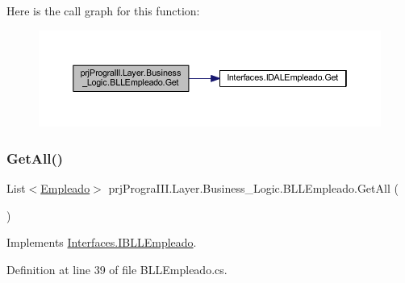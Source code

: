 Here is the call graph for this function\+:
\nopagebreak
\begin{figure}[H]
\begin{center}
\leavevmode
\includegraphics[width=350pt]{classprj_progra_i_i_i_1_1_layer_1_1_business___logic_1_1_b_l_l_empleado_abf66d9719a5e3c0f1914f0ae0d4ef671_cgraph}
\end{center}
\end{figure}
\hypertarget{classprj_progra_i_i_i_1_1_layer_1_1_business___logic_1_1_b_l_l_empleado_a78943295f86576befb00a28f59f64b07}{}\label{classprj_progra_i_i_i_1_1_layer_1_1_business___logic_1_1_b_l_l_empleado_a78943295f86576befb00a28f59f64b07} 
\subsubsection{\texorpdfstring{Get\+All()}{GetAll()}}
{\footnotesize\ttfamily List$<$\hyperlink{classprj_progra_i_i_i_1_1_layer_1_1_entities_1_1_empleado}{Empleado}$>$ prj\+Progra\+I\+I\+I.\+Layer.\+Business\+\_\+\+Logic.\+B\+L\+L\+Empleado.\+Get\+All (\begin{DoxyParamCaption}{ }\end{DoxyParamCaption})}



Implements \hyperlink{interface_interfaces_1_1_i_b_l_l_empleado_af28eb97c31bd09546d3ececa39800ae4}{Interfaces.\+I\+B\+L\+L\+Empleado}.



Definition at line 39 of file B\+L\+L\+Empleado.\+cs.

